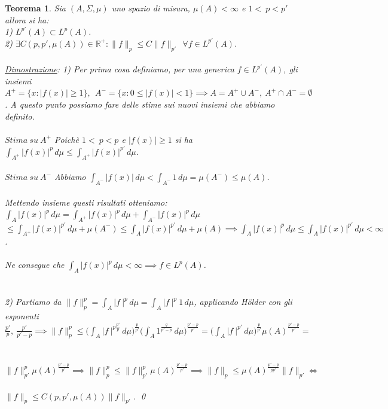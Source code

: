 \documentclass[a4paper,12pt]{report}
\newtheorem{teorema}{Teorema}[chapter]
\newcommand{\lt}{<}
\begin{document}
\begin{teorema}\label{thm: 3.6}
    Sia $(A,\Sigma,\mu)$ uno spazio di misura, $\mu(A) \lt\infty$ e $1\lt\ p\lt p'$ allora si ha:
    \\ 1) $L^{p'}(A) \subset L^p(A)$.
    \\ 2) $\exists C(p,p',\mu(A)) \in \mathbb{R}^+: \|f\|_p\leq C\|f\|_{p'} \ \ \forall f\in L^{p'}(A)$.
    \\
    \\ \underline{Dimostrazione}: 1) Per prima cosa definiamo, per una generica $f \in L^{p'}(A)$, gli insiemi $A^+=\{x: |f(x)|\geq 1\}, \  \ A^-=\{x:0\leq|f(x)|\lt 1\} \implies A=A^+\cup A^-, \ A^+ \cap A^-=\emptyset $. A questo punto possiamo fare delle stime sui nuovi insiemi che abbiamo definito.
    \\
    \\ $\boxed{Stima \ su \ A^+}$ Poichè $1\lt\ p\lt p$ e $|f(x)|\geq 1$ si ha $\displaystyle\int_{A^+}|f(x)|^p\,d\mu \leq \int_{A^+}|f(x)|^{p'}\,d\mu$.
    \\
    \\ $\boxed{Stima\ su \ A^-}$ Abbiamo $\displaystyle\int_{A^-}|f(x)|\,d\mu\lt \int_{A^-}1 \,d\mu=\mu(A^-)\leq \mu(A)$.
    \\
    \\ Mettendo insieme questi risultati otteniamo: $\displaystyle\int_A|f(x)|^p\,d\mu=\int_{A^+}|f(x)|^p\,d\mu+\int_{A^-}|f(x)|^p\,d\mu$
    \\ \mbox{$\leq\displaystyle\int_{A^+}|f(x)|^{p'}\,d\mu+\mu(A^-)\leq\int_A|f(x)|^{p'}\,d\mu+\mu(A)\implies \int_A|f(x)|^p\,d\mu\leq\int_A|f(x)|^{p'}\,d\mu\lt\infty$.}
    \\
    \\ Ne consegue che $\displaystyle\int_A|f(x)|^p\,d\mu\lt \infty\implies f\in L^p(A)$.
    \\
    \\
    \\ 2) Partiamo da $\|f\|_p^p=\displaystyle\int_A|f\ |^p\,d\mu=\int_A|f \ |^p \ 1\,d\mu$, applicando Hölder con gli esponenti $\displaystyle\frac{p'}{p}, \ \frac{p'}{p'-p}\implies \|f\|_p^p\leq\bigg(\int_A|f\ |^{p\frac{p'}{p}}\,d\mu\bigg)^\frac{p}{p'}\bigg(\int_A1^{\frac{q}{p'-p}}\,d\mu\bigg)^\frac{p'-p}{p'}=\bigg(\int_A|f\ |^{p'}\,d\mu\bigg)^\frac{p}{p'}\mu(A)^{\frac{p'-p}{p'}}=$
    \\
    \\
    \\$\|f\|_{p'}^p\mu(A)^{\frac{p'-p}{p'}}\implies \|f\|_p^p\leq\|f\|_{p'}^p\mu(A)^{\frac{p'-p}{p'}}\implies \|f\|_p\leq\mu(A)^{\frac{p'-p}{pp'}}\|f\|_{p'} \iff$ 
    \\
    \\$\|f\|_p\leq C(p,p',\mu(A))\|f\|_{p'}$. \qed
\end{teorema}
\end{document}

